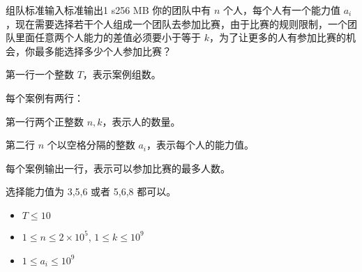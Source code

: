\begin{problem}{组队}{标准输入}{标准输出}{1 s}{256 MB}
你的团队中有 $n$ 个人，每个人有一个能力值 $a_i$，现在需要选择若干个人组成一个团队去参加比赛，由于比赛的规则限制，一个团队里面任意两个人能力的差值必须要小于等于 $k$，为了让更多的人有参加比赛的机会，你最多能选择多少个人参加比赛？

\InputFile
第一行一个整数 $T$，表示案例组数。

每个案例有两行：

第一行两个正整数 $n, k$，表示人的数量。

第二行 $n$ 个以空格分隔的整数 $a_i$，表示每个人的能力值。


\OutputFile
每个案例输出一行，表示可以参加比赛的最多人数。

\Example

\begin{example}
\end{example}

\Note
选择能力值为 3,5,6 或者 5,6,8 都可以。

\Constraints
\begin{itemize}
\item $T \leq 10$
\item $1 \leq n \leq 2 \times 10^5$, $1 \leq k \leq 10^9$
\item $1 \leq a_i \leq 10^9$
\end{itemize}
\end{problem}
